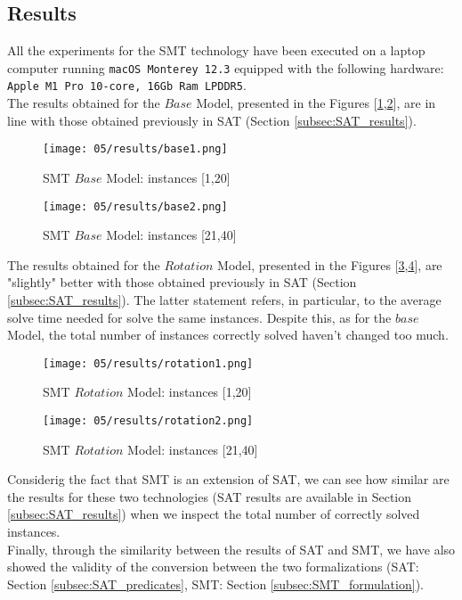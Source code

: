 
\subsection{Results}\label{subsec:SMT_results}
    All the experiments for the SMT technology have been executed on a laptop computer running 
    \texttt{macOS Monterey 12.3} equipped with the following hardware:
    \texttt{Apple M1 Pro 10-core, 16Gb Ram LPDDR5}.\\


    The results obtained for the \(Base\) Model, presented in the Figures 
    [\ref{fig:SMT_results_base1},\ref{fig:SMT_results_base2}], are in line with those obtained 
    previously in SAT (Section \ref{subsec:SAT_results}).\\

    \begin{figure}[H]
      \centering
      \texttt{[image: 05/results/base1.png]}
      \caption{SMT \(Base\) Model: instances [1,20]}
      \label{fig:SMT_results_base1}
    \end{figure}
    \begin{figure}[H]
      \centering
      \texttt{[image: 05/results/base2.png]}
      \caption{SMT \(Base\) Model: instances [21,40]}
      \label{fig:SMT_results_base2}
    \end{figure}

    The results obtained for the \(Rotation\) Model, presented in the Figures 
    [\ref{fig:SMT_results_rotation1},\ref{fig:SMT_results_rotation2}], are "slightly" better with 
    those obtained previously in SAT (Section \ref{subsec:SAT_results}). The latter statement 
    refers, in particular, to the average solve time needed for solve the same instances. Despite 
    this, as for the \(base\) Model, the total number of instances correctly solved haven't changed too much.\\

    \begin{figure}[H]
      \centering
      \texttt{[image: 05/results/rotation1.png]}
      \caption{SMT \(Rotation\) Model: instances [1,20]}
      \label{fig:SMT_results_rotation1}
    \end{figure}
    \begin{figure}[H]
      \centering
      \texttt{[image: 05/results/rotation2.png]}
      \caption{SMT \(Rotation\) Model: instances [21,40]}
      \label{fig:SMT_results_rotation2}
    \end{figure}

    Considerig the fact that SMT is an extension of SAT, we can see how similar are the results for
    these two technologies (SAT results are available in Section \ref{subsec:SAT_results}) when we 
    inspect the total number of correctly solved instances. \\

    Finally, through the similarity between the results of SAT and SMT, we have also showed the 
    validity of the conversion between the two formalizations 
    (SAT: Section \ref{subsec:SAT_predicates}, SMT: Section \ref{subsec:SMT_formulation}).
